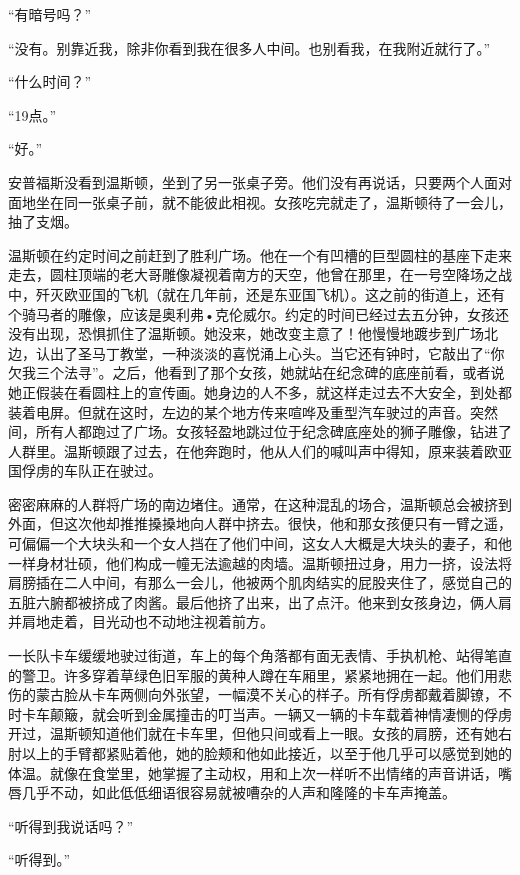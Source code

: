 ``有暗号吗？''

``没有。别靠近我，除非你看到我在很多人中间。也别看我，在我附近就行了。''

``什么时间？''

``19点。''

``好。''

安普福斯没看到温斯顿，坐到了另一张桌子旁。他们没有再说话，只要两个人面对面地坐在同一张桌子前，就不能彼此相视。女孩吃完就走了，温斯顿待了一会儿，抽了支烟。

温斯顿在约定时间之前赶到了胜利广场。他在一个有凹槽的巨型圆柱的基座下走来走去，圆柱顶端的老大哥雕像凝视着南方的天空，他曾在那里，在一号空降场之战中，歼灭欧亚国的飞机（就在几年前，还是东亚国飞机）。这之前的街道上，还有个骑马者的雕像，应该是奥利弗•克伦威尔。约定的时间已经过去五分钟，女孩还没有出现，恐惧抓住了温斯顿。她没来，她改变主意了！他慢慢地踱步到广场北边，认出了圣马丁教堂，一种淡淡的喜悦涌上心头。当它还有钟时，它敲出了``你欠我三个法寻''。之后，他看到了那个女孩，她就站在纪念碑的底座前看，或者说她正假装在看圆柱上的宣传画。她身边的人不多，就这样走过去不大安全，到处都装着电屏。但就在这时，左边的某个地方传来喧哗及重型汽车驶过的声音。突然间，所有人都跑过了广场。女孩轻盈地跳过位于纪念碑底座处的狮子雕像，钻进了人群里。温斯顿跟了过去，在他奔跑时，他从人们的喊叫声中得知，原来装着欧亚国俘虏的车队正在驶过。

密密麻麻的人群将广场的南边堵住。通常，在这种混乱的场合，温斯顿总会被挤到外面，但这次他却推推搡搡地向人群中挤去。很快，他和那女孩便只有一臂之遥，可偏偏一个大块头和一个女人挡在了他们中间，这女人大概是大块头的妻子，和他一样身材壮硕，他们构成一幢无法逾越的肉墙。温斯顿扭过身，用力一挤，设法将肩膀插在二人中间，有那么一会儿，他被两个肌肉结实的屁股夹住了，感觉自己的五脏六腑都被挤成了肉酱。最后他挤了出来，出了点汗。他来到女孩身边，俩人肩并肩地走着，目光动也不动地注视着前方。

一长队卡车缓缓地驶过街道，车上的每个角落都有面无表情、手执机枪、站得笔直的警卫。许多穿着草绿色旧军服的黄种人蹲在车厢里，紧紧地拥在一起。他们用悲伤的蒙古脸从卡车两侧向外张望，一幅漠不关心的样子。所有俘虏都戴着脚镣，不时卡车颠簸，就会听到金属撞击的叮当声。一辆又一辆的卡车载着神情凄恻的俘虏开过，温斯顿知道他们就在卡车里，但他只间或看上一眼。女孩的肩膀，还有她右肘以上的手臂都紧贴着他，她的脸颊和他如此接近，以至于他几乎可以感觉到她的体温。就像在食堂里，她掌握了主动权，用和上次一样听不出情绪的声音讲话，嘴唇几乎不动，如此低低细语很容易就被嘈杂的人声和隆隆的卡车声掩盖。

``听得到我说话吗？''

``听得到。''

